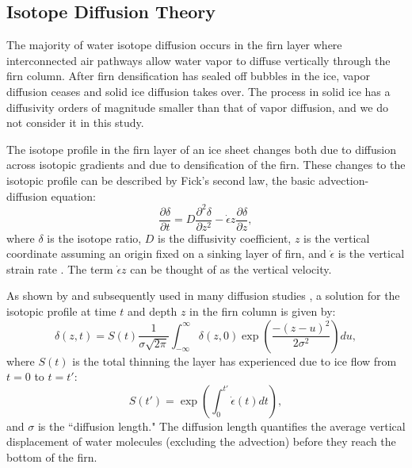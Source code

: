 \documentclass[draft, jgrga]{AGUTeX}
\begin{document}
\begin{article}

\section{Isotope Diffusion Theory}

The majority of water isotope diffusion occurs in the firn layer where interconnected air pathways allow water vapor to diffuse vertically through the firn column. After firn densification has sealed off bubbles in the ice, vapor diffusion ceases and solid ice diffusion takes over. The process in solid ice has a diffusivity orders of magnitude smaller than that of vapor diffusion, and we do not consider it in this study.

The isotope profile in the firn layer of an ice sheet changes both due to diffusion across isotopic gradients and due to densification of the firn. These changes to the isotopic profile can be described by Fick's second law, the basic advection-diffusion equation:
\begin{equation}
\frac{\partial \delta}{\partial t}
= D \frac{\partial ^2 \delta}{\partial z^2}
- \dot{\epsilon}
z \frac{\partial \delta}{\partial z},
\end{equation}
where $\delta$ is the isotope ratio, $D$ is the diffusivity coefficient, $z$ is the vertical coordinate assuming an origin fixed on a sinking layer of firn, and $\dot{\epsilon}$ is the vertical strain rate \citep{Johnsen1977, Whillans1985}. The term $\dot{\epsilon} z$ can be thought of as the vertical velocity.

As shown by \citet{Johnsen1977} and subsequently used in many diffusion studies \citep{Cuffey1998, Whillans1985, Johnsen2000, Simonsen2011, Gkinis2014, vanderWel2015, Jones2017a, Holme2017}, a solution for the isotopic profile at time $t$ and depth $z$ in the firn column is given by:
\begin{equation}
\label{eq:diff_sol}
\delta (z,t) = S(t) \frac{1}{\sigma \sqrt{2 \pi}}
\int^\infty_{-\infty} \delta (z,0) \exp \left(\frac{-(z-u)^2}{2 \sigma ^2} \right)du,
\end{equation}
where \begin{math} S(t) \end{math} is the total thinning the layer has experienced due to ice flow from $t=0$ to $t=t'$:
\begin{equation}
S(t') = \exp \left( \int^{t'}_{0} \dot{\epsilon}(t) dt \right),
\end{equation}
and $\sigma$ is the ``diffusion length." The diffusion length quantifies the average vertical displacement of water molecules (excluding the advection) before they reach the bottom of the firn.


\end{article}
\end{document}
